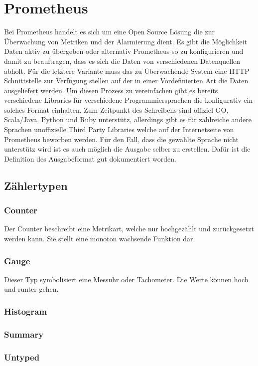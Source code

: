 \section{Prometheus}
Bei Prometheus handelt es sich um eine Open Source Lösung die zur Überwachung von Metriken und der Alarmierung dient. Es gibt die Möglichkeit Daten aktiv zu übergeben oder alternativ Prometheus so zu konfigurieren und damit zu beauftragen, dass es sich die Daten von verschiedenen Datenquellen abholt. Für die letztere Variante muss das zu Überwachende System eine HTTP Schnittstelle zur Verfügung stellen auf der in einer Vordefinierten Art die Daten ausgeliefert werden. Um diesen Prozess zu vereinfachen gibt es bereits verschiedene Libraries für verschiedene Programmiersprachen die konfigurativ ein solches Format einhalten. Zum Zeitpunkt des Schreibens sind offiziel GO, Scala/Java, Python und Ruby unterstütz, allerdings gibt es für zahlreiche andere Sprachen unoffizielle Third Party Libraries welche auf der Internetseite von Prometheus beworben werden. Für den Fall, dass die gewählte Sprache nicht unterstütz wird ist es auch möglich die Ausgabe selber zu erstellen. Dafür ist die Definition des Ausgabeformat gut dokumentiert worden. 
\subsection{Zählertypen}
\subsubsection{Counter}
Der Counter beschreibt eine Metrikart, welche nur hochgezählt und zurückgesetzt werden kann. Sie stellt eine monoton wachsende Funktion dar. 
\subsubsection{Gauge}
Dieser Typ symbolisiert eine Messuhr oder Tachometer. Die Werte können hoch und runter gehen. 

\subsubsection{Histogram}
\subsubsection{Summary}
\subsubsection{Untyped}

